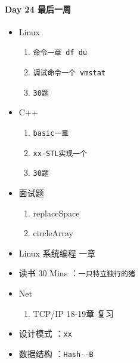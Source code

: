 \documentclass[UTF8,a4paper,8pt]{ctexart}
\begin{document}
 	 \paragraph{Day 24  最后一周    \quad     }
	 	 \begin{itemize}[itemindent = 1em]
	 	 	\renewcommand\labelitemi{\makebox[0pt][l]{$\square$}\hspace{1em}} 
	 	 	\renewcommand\labelitemi{\makebox[0pt][l]{$\square$}\raisebox{.15ex}{\hspace{0.1em}$\checkmark$}}	 	
	 	 	\item   Linux 
		 	 	\begin{enumerate}
		 	 		\item \verb|命令一章 df du|
		 	 		\item \verb|调试命令一个 vmstat|
		 	 		\item \verb|30题|
		 	 	\end{enumerate}
	 	 	\item   C++   
		 	 	\begin{enumerate}
		 	 		\item \verb|basic一章|
		 	 		\item \verb|xx-STL实现一个|
		 	 		\item \verb|30题|
		 	 	\end{enumerate}
	 	 	
	 	 	\item  面试题
		 	 	\begin{enumerate}
		 	 		\item replaceSpace
		 	 		\item circleArray
		 	 	\end{enumerate}
		 	 	
	 	 	\item  Linux 系统编程 一章
	 	 	
	 	 	\item   读书  30 Mins	：\verb|一只特立独行的猪|
	 	 	\item   Net
		 	 	\begin{enumerate}
		 	 		\item TCP/IP  18-19章 复习
		 	 	\end{enumerate}	
	 	 	
	 	 	\renewcommand\labelitemi{\makebox[0pt][l]{$\square$}\hspace{1em}}
	 	 	\item   设计模式 ：\verb|xx| 
	 	 	\item   数据结构 ：\verb|Hash--B| 
	 	 \end{itemize}
\end{document}

